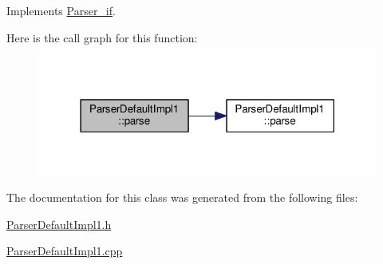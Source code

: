 Implements \hyperlink{class_parser__if_af163b0c5b081ccfa2ba04267cd4741b1}{Parser\+\_\+if}.



Here is the call graph for this function\+:\nopagebreak
\begin{figure}[H]
\begin{center}
\leavevmode
\includegraphics[width=318pt]{class_parser_default_impl1_af8bd248de0bfbf6148c0e86d9ad2184c_cgraph}
\end{center}
\end{figure}




The documentation for this class was generated from the following files\+:\begin{DoxyCompactItemize}
\item 
\hyperlink{_parser_default_impl1_8h}{Parser\+Default\+Impl1.\+h}\item 
\hyperlink{_parser_default_impl1_8cpp}{Parser\+Default\+Impl1.\+cpp}\end{DoxyCompactItemize}
